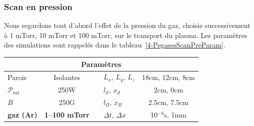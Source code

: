 \begin{refsection}
\subsubsection{Scan en pression}
Nous regardons tout d'abord l'effet de la pression du gaz, choisie
successivement à 1 mTorr, 10 mTorr et 100 mTorr, sur le transport du plasma.
Les paramètres des simulations sont rappelés dans le
	tableau~\ref{4-PegasesScanPreParam}. 

\begin{minipage}{\textwidth}
\footnotesize\centering
{}
\begin{tabular}{lcclc}\toprule
\multicolumn{5}{c}{\bf Paramètres}\\
\midrule 
Parois & Isolantes &&$L_x$, $L_y$, $L_z$  & 18cm, 12cm,
8cm\\
$\mathcal{P}_\text{ext}$&250W&&$l_\mathcal{S}$, $x_\mathcal{S}$&2cm, 0cm\\
$B$&250G&&$l_B$, $x_B$&2.5cm, 7.5cm\\
\textbf{gaz (Ar)} & \textbf{1--100 mTorr}&&$\Delta t$, $\Delta x$&10$^{-8}$s,
1mm\\
\bottomrule
\end{tabular}
\label{4-PegasesScanPreParam}
\end{minipage}	
	

\end{refsection}

